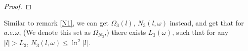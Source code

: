 \begin{proof}
\end{proof}
\begin{remark}\label{N3}
 Similar to remark \ref{N1}, we can get $\Omega_3(l)$, $N_3(l,\omega)$ instead, and get that for $a.e.\omega$, (We denote this set as $\Omega_{N_3}$,)  there exists $L_3(\omega)$, such that for any $|l|>L_3$, $N_3(l,\omega)\leq \ln^2 |l|$.
\end{remark}
